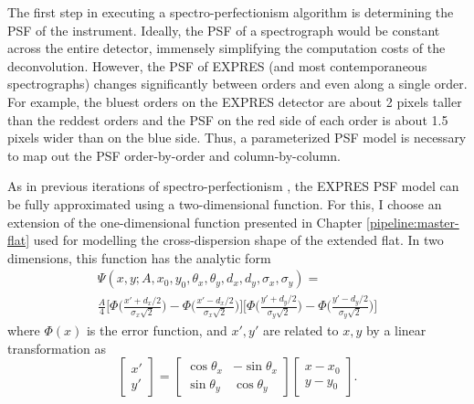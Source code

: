 The first step in executing a spectro-perfectionism algorithm is determining the PSF of the instrument. Ideally, the PSF of a spectrograph would be constant across the entire detector, immensely simplifying the computation costs of the deconvolution. However, the PSF of EXPRES (and most contemporaneous spectrographs) changes significantly between orders and even along a single order. For example, the bluest orders on the EXPRES detector are about 2 pixels taller than the reddest orders and the PSF on the red side of each order is about 1.5 pixels wider than on the blue side. Thus, a parameterized PSF model is necessary to map out the PSF order-by-order and column-by-column.

As in previous iterations of spectro-perfectionism \citep{bolton_spectro-perfectionism_2009, cornachione_full_2019}, the EXPRES PSF model can be fully approximated using a two-dimensional function. For this, I choose an extension of the one-dimensional function presented in Chapter \ref{pipeline:master-flat} used for modelling the cross-dispersion shape of the extended flat. In two dimensions, this function has the analytic form
\begin{multline}
    \Psi(x, y; A, x_0, y_0, \theta_x, \theta_y, d_x, d_y, \sigma_x, \sigma_y) = \\
    \frac{A}{4} \Bigg[\Phi\bigg(\frac{x' + d_x/2}{\sigma_x \sqrt{2}}\bigg) - \Phi\bigg(\frac{x' - d_x/2}{\sigma_x \sqrt{2}}\bigg)\Bigg] \Bigg[\Phi\bigg(\frac{y' + d_y/2}{\sigma_y \sqrt{2}}\bigg) - \Phi\bigg(\frac{y' - d_y/2}{\sigma_y \sqrt{2}}\bigg)\Bigg]
    \label{eq:expres_psf}
\end{multline}
where $\Phi(x)$ is the error function, and $x',y'$ are related to $x,y$ by a linear transformation as
\begin{equation}
    \begin{bmatrix}x' \\ y' \end{bmatrix} = 
    \begin{bmatrix}\cos \theta_x & -\sin\theta_x \\ \sin \theta_y & \cos\theta_y\end{bmatrix}\begin{bmatrix}x-x_0 \\ y-y_0\end{bmatrix}.
    \label{eq:pix-transformation}
\end{equation}

